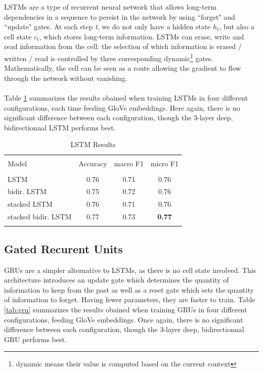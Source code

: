 \documentclass[final]{cvpr}
\begin{document}
LSTMs are a type of recurrent neural network that allows long-term dependencies in a sequence to persist in the network by using “forget" and “update" gates. At each step \textit{t}, we do not only have a hidden state $h_t$, but also a cell state $c_t$, which stores long-term information. LSTMs can erase, write and read information from the cell: the selection of which information is erased / written / read is controlled by three corresponding dynamic\footnote{dynamic means their value is computed based on the current context} gates. Mathematically, the cell can be seen as a route allowing the gradient to flow through the network without vanishing.\\
\\
Table \ref{tab:lstm} summarizes the results obained when training LSTMs in four different configurations, each time feeding GloVe embeddings. Here again, there is no significant difference between each configuration, though the 3-layer deep, bidirectionnal LSTM performs best.

\begin{table}[h!]
	\begin{center}
		\begin{tabular}{ l c c c  } 
			\hline
			\\ [-1.7mm] 
			Model & Accuracy & macro F1 & micro F1 \\ [0.7mm] 
			\hline
			\\ [-1.5mm] 
			LSTM & 0.76 & 0.71 & 0.76 \\
			bidir. LSTM & 0.75 & 0.72 & 0.76 \\
			stacked LSTM & 0.76 & 0.71 & 0.76\\
			stacked bidir. LSTM & 0.77 & 0.73 & \textbf{0.77} \\ [0.5mm] 
			\hline
			\\ [-2.9mm] 
		\end{tabular}
		\caption{LSTM Results}
		\label{tab:lstm}
	\end{center}
\end{table}

\vspace{-3mm}

\subsection{Gated Recurent Units}

GRUs are a simpler alternative to LSTMs, as there is no cell state involved. This architecture introduces an update gate which determines the quantity of information to keep from the past as well as a reset gate which sets the quantity of information to forget. Having fewer parameters, they are faster to train. Table \ref{tab:gru} summarizes the results obained when training GRUs in four different configurations, feeding GloVe embeddings. Once again, there is no significant difference between each configuration, though the 3-layer deep, bidirectionnal GRU performs best.
\end{document}
